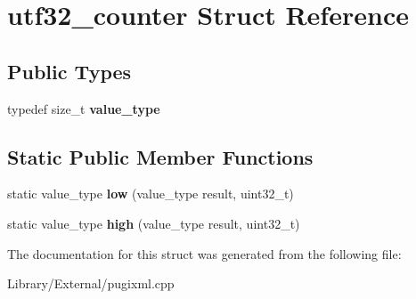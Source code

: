 \hypertarget{structutf32__counter}{}\section{utf32\+\_\+counter Struct Reference}
\label{structutf32__counter}
\subsection*{Public Types}
\begin{DoxyCompactItemize}
\item 
\hypertarget{structutf32__counter_a6fb6728fe1a009958000f0e934fa6500}{}typedef size\+\_\+t {\bfseries value\+\_\+type}\label{structutf32__counter_a6fb6728fe1a009958000f0e934fa6500}

\end{DoxyCompactItemize}
\subsection*{Static Public Member Functions}
\begin{DoxyCompactItemize}
\item 
\hypertarget{structutf32__counter_a3a75f4840e0391ed972ddba621d49480}{}static value\+\_\+type {\bfseries low} (value\+\_\+type result, uint32\+\_\+t)\label{structutf32__counter_a3a75f4840e0391ed972ddba621d49480}

\item 
\hypertarget{structutf32__counter_aa72f5248b1dc5937330ab049bf449251}{}static value\+\_\+type {\bfseries high} (value\+\_\+type result, uint32\+\_\+t)\label{structutf32__counter_aa72f5248b1dc5937330ab049bf449251}

\end{DoxyCompactItemize}


The documentation for this struct was generated from the following file\+:\begin{DoxyCompactItemize}
\item 
Library/\+External/pugixml.\+cpp\end{DoxyCompactItemize}

